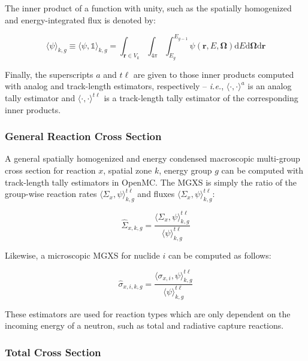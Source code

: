 \noindent The inner product of a function with unity, such as the spatially homogenized and energy-integrated flux is denoted by:

\begin{equation}
\label{eqn:chap3-angle-flux}
\langle \psi \rangle_{k,g} \equiv \langle \psi, \mathbb{1} \rangle_{k,g} = \int_{\mathbf{r} \in V_{k}} \int_{4\pi} \int_{E_{g}}^{E_{g-1}} \psi(\mathbf{r},E,\mathbf{\Omega}) \mathrm{d}E\mathrm{d}\mathbf{\Omega}\mathrm{d}\mathbf{r}
\end{equation}

Finally, the superscripts $a$ and $t\ell$ are given to those inner products computed with analog and track-length estimators, respectively -- \textit{i.e.}, $\langle \cdot,\cdot \rangle^{a}$ is an analog tally estimator and $\langle \cdot,\cdot \rangle^{t\ell}$ is a track-length tally estimator of the corresponding inner products.


\subsubsection{General Reaction Cross Section}
\label{subsubsec:chap3-gen-xs}

A general spatially homogenized and energy condensed macroscopic multi-group cross section for reaction $x$, spatial zone $k$, energy group $g$ can be computed with track-length tally estimators in OpenMC. The \ac{MGXS} is simply the ratio of the group-wise reaction rates $\langle \Sigma_{x}, \psi \rangle_{k,g}^{t\ell}$ and fluxes $\langle \Sigma_{x}, \psi \rangle_{k,g}^{t\ell}$:

\begin{equation}
\label{eqn:chap3-general-macro}
\hat{\Sigma}_{x,k,g} = \frac{\langle \Sigma_{x}, \psi \rangle_{k,g}^{t\ell}}{\langle \psi \rangle_{k,g}^{t\ell}}
\end{equation}

\noindent Likewise, a microscopic \ac{MGXS} for nuclide $i$ can be computed as follows:

\begin{equation}
\label{eqn:chap3-general-micro}
\hat{\sigma}_{x,i,k,g} = \frac{\langle \sigma_{x,i}, \psi \rangle_{k,g}^{t\ell}}{\langle \psi \rangle_{k,g}^{t\ell}}
\end{equation}

These estimators are used for reaction types which are only dependent on the incoming energy of a neutron, such as total and radiative capture reactions.


\subsubsection{Total Cross Section}
\label{subsubsec:chap3-tally-types-tot-xs}


